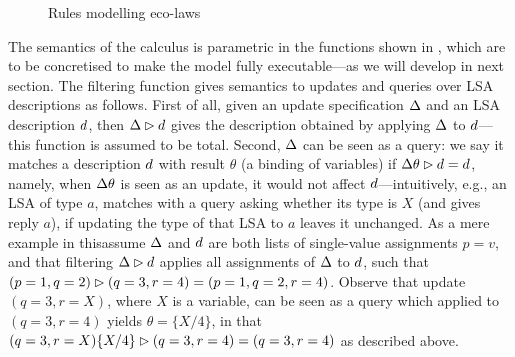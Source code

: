\documentclass[12pt,a4paper,twoside,openright]{book}
\begin{document}
\begin{figure}{
 } \caption[A process algebra for SAPERE: eco-laws]{Rules modelling eco-laws} \label{fig:eco_laws}
\end{figure}

The semantics of the calculus is parametric in the functions shown in , which are to be concretised to make the model fully executable---as we will develop in next section.
%
The filtering function gives semantics to updates and queries over LSA descriptions as follows.
%
First of all, given an update specification $\Delta$ and an LSA description $d$, then $\Delta\rhd d$ gives the description obtained by applying $\Delta$ to $d$---this function is assumed to be total.
%
Second, $\Delta$ can be seen as a query: we say it matches a description $d$ with result $\theta$ (a binding of variables) if $\Delta\theta\rhd d=d$, namely, when $\Delta\theta$ is seen as an update, it would not affect $d$---intuitively, e.g., an LSA of type $a$, matches with a query asking whether its type is $X$ (and gives reply $a$), if updating the type of that LSA to $a$ leaves it unchanged.
%
As a mere example in this\levelText{}assume $\Delta$ and $d$ are both lists of single-value assignments $p = v$, and that filtering \mbox{$\Delta\rhd d$} applies all assignments of $\Delta$ to $d$, such that \mbox{$(p=1,q=2)\rhd (q=3,r=4)=(p=1,q=2,r=4)$}. Observe that update $(q=3,r=X)$, where $X$ is a variable, can be seen as a query which applied to $(q=3,r=4)$ yields $\theta=\{X/4\}$, in that \mbox{$(q=3,r=X)\{X/4\}\rhd (q=3,r=4)=(q=3,r=4)$} as described above.
\end{document}
